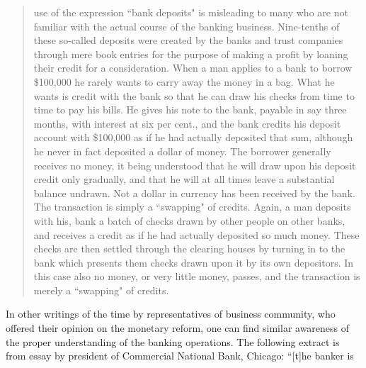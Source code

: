 {\begin{quote}
use of the expression ``bank deposits" is misleading to many who
are not familiar with the actual course of the banking business.
Nine-tenths of these so-called deposits were created by the banks
and trust companies through mere book entries for the purpose
of making a profit by loaning their credit for a consideration.
When a man applies to a bank to borrow \$100,000 he rarely wants
to carry away the money in a bag. What he wants is credit with
the bank so that he can draw his checks from time to time to pay
his bills. He gives his note to the bank, payable in say three
months, with interest at six per cent., and the bank credits his
deposit account with \$100,000 as if he had actually deposited that
sum, although he never in fact deposited a dollar of money. The
borrower generally receives no money, it being understood that he
will draw upon his deposit credit only gradually, and that he will
at all times leave a substantial balance undrawn. Not a dollar in
currency has been received by the bank. The transaction is
simply a ``swapping" of credits. Again, a man deposits with his,
bank a batch of checks drawn by other people on other banks,
and receives a credit as if he had actually deposited so much
money. These checks are then settled through the clearing houses by turning in to the bank which presents them checks drawn upon it by its own depositors. In this case also no money, or very little money, passes, and the transaction is merely a ``swapping" of credits. \citep[pp.~347-348]{morawetz1908}\end{quote}In other writings of the time by representatives of business community, who offered their opinion on the monetary reform, one can find similar awareness of the proper understanding of the banking operations. The following extract is from essay by president of Commercial National Bank, Chicago: ``[t]he banker is
}
